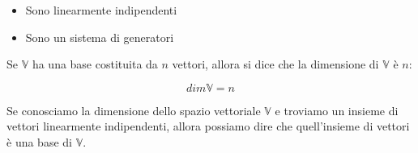 \documentclass{article}
\begin{document}
\begin{itemize}
    \item Sono linearmente indipendenti
    \item Sono un sistema di generatori
\end{itemize}

\noindent
Se $\mathbb{V}$ ha una base costituita da $n$ vettori, allora si dice che la dimensione di $\mathbb{V}$ è $n$:

$$
dim \mathbb{V} = n
$$

\noindent
Se conosciamo la dimensione dello spazio vettoriale $\mathbb{V}$ e troviamo un insieme di vettori linearmente indipendenti, allora possiamo dire che quell'insieme di vettori è una base di $\mathbb{V}$.
\end{document}
